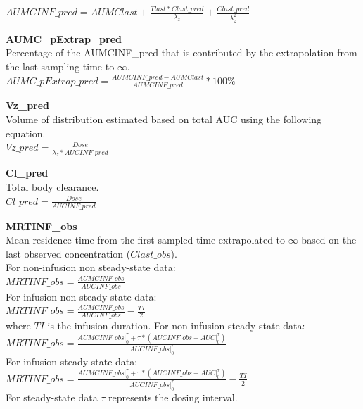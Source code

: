 \documentclass[
  10pt,
]{krantz}
\begin{document}
\(AUMCINF\_pred = AUMClast+\frac{Tlast*Clast\_pred}{\lambda_z}+\frac{Clast\_pred}{\lambda_{z}^2}\)

\textbf{AUMC\_pExtrap\_pred}\\
Percentage of the AUMCINF\_pred that is contributed by the extrapolation from the last sampling time to \({\infty}\).\\
\(AUMC\_pExtrap\_pred = \frac{AUMCINF\_pred-AUMClast}{AUMCINF\_pred}*100\%\)

\textbf{Vz\_pred}\\
Volume of distribution estimated based on total AUC using the following equation.\\
\(Vz\_pred = \frac{Dose}{\lambda_z*AUCINF\_pred}\)

\textbf{Cl\_pred}\\
Total body clearance.\\
\(Cl\_pred = \frac{Dose}{AUCINF\_pred}\)

\textbf{MRTINF\_obs}\\
Mean residence time from the first sampled time extrapolated to \({\infty}\) based on the last observed concentration (\({Clast\_obs}\)).\\
For non-infusion non steady-state data:\\
\(MRTINF\_obs = \frac{AUMCINF\_obs}{AUCINF\_obs}\)\\
For infusion non steady-state data:\\
\(MRTINF\_obs = \frac{AUMCINF\_obs}{AUCINF\_obs}-\frac{TI}{2}\)\\
where \({TI}\) is the infusion duration. For non-infusion steady-state data:\\
\(MRTINF\_obs = \frac{AUMCINF\_obs|_{0}^{\tau}+\tau*(AUCINF\_obs-AUC|_{0}^{\tau})}{AUCINF\_obs|_{0}^{\tau}}\)\\
For infusion steady-state data:\\
\(MRTINF\_obs = \frac{AUMCINF\_obs|_{0}^{\tau}+\tau*(AUCINF\_obs-AUC|_{0}^{\tau})}{AUCINF\_obs|_{0}^{\tau}}-\frac{TI}{2}\)\\
For steady-state data \({\tau}\) represents the dosing interval.
\end{document}
